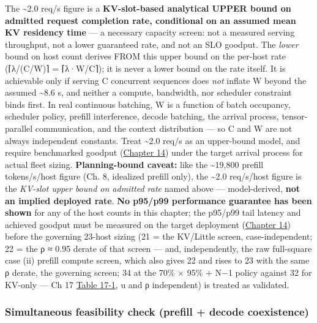 The \textasciitilde2.0 req/s figure is a \textbf{KV-slot-based
analytical UPPER bound on admitted request completion rate, conditional
on an assumed mean KV residency time} --- a necessary capacity screen:
not a measured serving throughput, not a lower guaranteed rate, and not
an SLO goodput. The \emph{lower} bound on host count derives FROM this
upper bound on the per-host rate (⌈λ/(C/W)⌉ = ⌈λ·W/C⌉); it is never a
lower bound on the rate itself. It is achievable only if serving C
concurrent sequences does \emph{not} inflate W beyond the assumed
\textasciitilde8.6 s, and neither a compute, bandwidth, nor scheduler
constraint binds first. In real continuous batching, W is a function of
batch occupancy, scheduler policy, prefill interference, decode
batching, the arrival process, tensor-parallel communication, and the
context distribution --- so C and W are not always independent
constants. Treat \textasciitilde2.0 req/s as an upper-bound model, and
require benchmarked goodput (\hyperref[chap:14]{Chapter 14}) under the target arrival
process for actual fleet sizing. \textbf{Planning-bound caveat:} like
the \textasciitilde19,800 prefill tokens/s/host figure (Ch. 8, idealized
prefill only), the \textasciitilde2.0 req/s/host figure is the
\emph{KV-slot upper bound on admitted rate} named above ---
model-derived, \textbf{not an implied deployed rate}. \textbf{No p95/p99
performance guarantee has been shown} for any of the host counts in this
chapter; the p95/p99 tail latency and achieved goodput must be measured
on the target deployment (\hyperref[chap:14]{Chapter 14}) before the governing 23-host
sizing (21 = the KV/Little screen, case-independent; 22 = the ρ ≈ 0.95
derate of that screen --- and, independently, the raw full-square case
(ii) prefill compute screen, which also gives 22 and rises to 23 with
the same ρ derate, the governing screen; 34 at the 70\% × 95\% + N−1
policy against 32 for KV-only --- Ch 17 \hyperref[tab:17.1]{Table 17-1}, u and ρ independent)
is treated as validated.

\subsubsection{Simultaneous feasibility check (prefill + decode
coexistence)}\label{simultaneous-feasibility-check-prefill-decode-coexistence}

